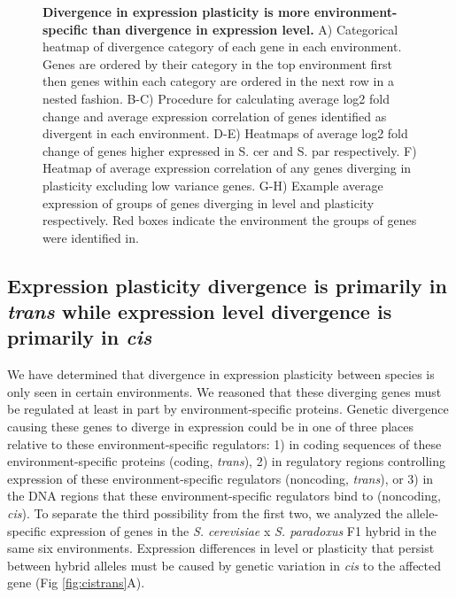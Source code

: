 \begin{figure}
    \centering
    \caption{\textbf{Divergence in expression plasticity is more environment-specific than divergence in expression level.} A) Categorical heatmap of divergence category of each gene in each environment. Genes are ordered by their category in the top environment first then genes within each category are ordered in the next row in a nested fashion. B-C) Procedure for calculating average log2 fold change and average expression correlation of genes identified as divergent in each environment. D-E) Heatmaps of average log2 fold change of genes higher expressed in S. cer and S. par respectively. F) Heatmap of average expression correlation of any genes diverging in plasticity excluding low variance genes. G-H) Example average expression of groups of genes diverging in level and plasticity respectively. Red boxes indicate the environment the groups of genes were identified in.}
    \label{fig:patterns}
\end{figure}

\subsection{Expression plasticity divergence is primarily in \textit{trans} while expression level divergence is primarily in \textit{cis}}

We have determined that divergence in expression plasticity between species is only seen in certain environments. We reasoned that these diverging genes must be regulated at least in part by environment-specific proteins. Genetic divergence causing these genes to diverge in expression could be in one of three places relative to these environment-specific regulators: 1) in coding sequences of these environment-specific proteins (coding, \textit{trans}), 2) in regulatory regions controlling expression of these environment-specific regulators (noncoding, \textit{trans}), or 3) in the DNA regions that these environment-specific regulators bind to (noncoding, \textit{cis}). To separate the third possibility from the first two, we analyzed the allele-specific expression of genes in the \textit{S. cerevisiae} x \textit{S. paradoxus} F1 hybrid in the same six environments. Expression differences in level or plasticity that persist between hybrid alleles must be caused by genetic variation in \textit{cis} to the affected gene (Fig \ref{fig:cistrans}A).

